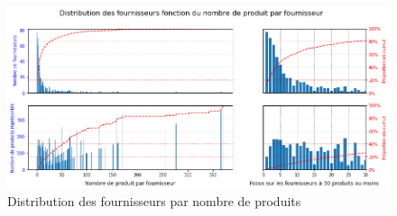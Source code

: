                 \begin{figure}[htbp]
                    \begin{center}
                    \includegraphics[width=\linewidth]{img/distribution_fournisseurs_par_prd_count.png}
                    \end{center}
                    \caption{Distribution des fournisseurs par nombre de produits}
                    \label{fig:distrib_fourn_pdts}
                \end{figure}
        

